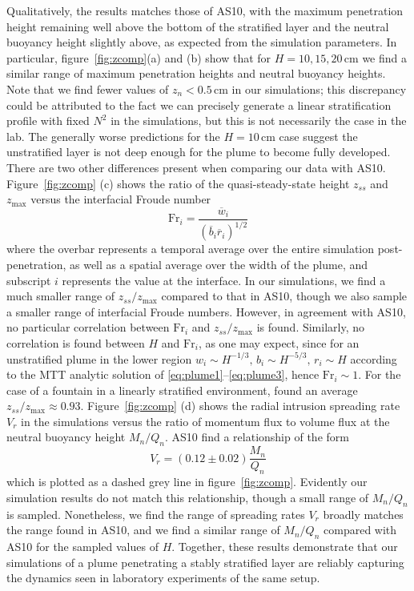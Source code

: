 \documentclass[a4paper]{article}
\begin{document}
Qualitatively, the results matches those of AS10, with the maximum penetration height remaining well above the
bottom of the stratified layer and the neutral buoyancy height slightly above, as expected from the simulation
parameters. In particular, figure~\ref{fig:zcomp}(a) and (b) show that for $H = 10, 15, 20 \,\mathrm{cm}$ we
find a similar range of maximum penetration heights and neutral buoyancy heights. Note that we find fewer
values of $z_n < 0.5 \,\mathrm{cm}$ in our simulations; this discrepancy could be attributed to the fact we
can precisely generate a linear stratification profile with fixed $N^2$ in the simulations, but this is not
necessarily the case in the lab. The generally worse predictions for the $H = 10 \, \mathrm{cm}$ case suggest
the unstratified layer is not deep enough for the plume to become fully developed. There are two other
differences present when comparing our data with AS10.  Figure~\ref{fig:zcomp} (c) shows the ratio of the
quasi-steady-state height $z_{ss}$ and $z_{\max}$ versus the interfacial Froude number
\begin{equation}
	\mathrm{Fr}_i = \frac{\overline{w}_i}{\left( \overline{b}_i \overline{r}_i\right)^{1/2}}
\end{equation}
where the overbar represents a temporal average over the entire simulation post-penetration, as well as a
spatial average over the width of the plume, and subscript $i$ represents the value at the interface. In our
simulations, we find a much smaller range of $z_{ss}/z_{\max}$ compared to that in AS10, though we also sample
a smaller range of interfacial Froude numbers. However, in agreement with AS10, no particular correlation
between $\mathrm{Fr}_i$ and $z_{ss}/z_{\max}$ is found. Similarly, no correlation is found between $H$ and
$\mathrm{Fr}_i$, as one may expect, since for an unstratified plume in the lower region $w_i \sim H^{-1/3}, \,
b_i \sim H^{-5/3}, \, r_i \sim H$ according to the MTT analytic solution of
\eqref{eq:plume1}--\eqref{eq:plume3}, hence $\mathrm{Fr}_i \sim 1$. For the case of a fountain in a linearly
stratified environment, \citet{bloomfield1998} found an average $z_{ss}/z_{\max} \approx 0.93$.
Figure~\ref{fig:zcomp} (d) shows the radial intrusion spreading rate $V_r$ in the simulations versus the ratio
of momentum flux to volume flux at the neutral buoyancy height $M_n/Q_n$. AS10 find a relationship of the form
\begin{equation}
	V_r = (0.12 \pm 0.02) \frac{M_n}{Q_n}
\end{equation}
which is plotted as a dashed grey line in figure~\ref{fig:zcomp}. Evidently our simulation results do not
match this relationship, though a small range of $M_n/Q_n$ is sampled. Nonetheless, we find the range of
spreading rates $V_r$ broadly matches the range found in AS10, and we find a similar range of $M_n/Q_n$
compared with AS10 for the sampled values of $H$. Together, these results demonstrate that our simulations of
a plume penetrating a stably stratified layer are reliably capturing the dynamics seen in laboratory
experiments of the same setup.
\end{document}
